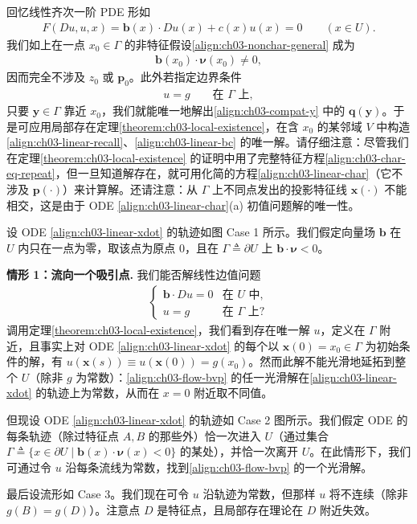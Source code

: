 \documentclass[../../main.tex]{subfiles}
\begin{document}
回忆线性齐次一阶 PDE 形如
\begin{align}\label{align:ch03-linear-recall}
F(Du,u,x)=\mathbf{b}(x)\cdot Du(x)+c(x)u(x)=0 \qquad (x\in U).
\end{align}
我们如上在一点 $x_0\in\Gamma$ 的非特征假设\eqref{align:ch03-nonchar-general} 成为
\begin{align}\label{align:ch03-linear-nonchar}
\mathbf{b}(x_0)\cdot\boldsymbol{\nu}(x_0)\neq 0,
\end{align}
因而完全不涉及 $z_0$ 或 $\mathbf{p}_0$。此外若指定边界条件
\begin{align}\label{align:ch03-linear-bc}
u=g \qquad \text{在 }\Gamma\text{ 上},
\end{align}
只要 $\mathbf{y}\in\Gamma$ 靠近 $x_0$，我们就能唯一地解出\eqref{align:ch03-compat-y} 中的 $\mathbf{q}(\mathbf{y})$。于是可应用局部存在定理\cref{theorem:ch03-local-existence}，在含 $x_0$ 的某邻域 $V$ 中构造\eqref{align:ch03-linear-recall}、\eqref{align:ch03-linear-bc} 的唯一解。请仔细注意：尽管我们在定理\cref{theorem:ch03-local-existence} 的证明中用了完整特征方程\eqref{align:ch03-char-eq-repeat}，但一旦知道解存在，就可用化简的方程\eqref{align:ch03-linear-char}（它不涉及 $\mathbf{p}(\cdot)$）来计算解。还请注意：从 $\Gamma$ 上不同点发出的投影特征线 $\mathbf{x}(\cdot)$ 不能相交，这是由于 ODE \eqref{align:ch03-linear-char}(a) 初值问题解的唯一性。

\begin{example}\label{example:ch03-flow}
设 ODE \eqref{align:ch03-linear-xdot} 的轨迹如图 Case 1 所示。我们假定向量场 $\mathbf{b}$ 在 $U$ 内只在一点为零，取该点为原点 $0$，且在 $\Gamma\triangleq\partial U$ 上 $\mathbf{b}\cdot\boldsymbol{\nu}<0$。

\textbf{情形 1：流向一个吸引点.} 我们能否解线性边值问题
\begin{align}\label{align:ch03-flow-bvp}
\begin{cases}
\mathbf{b}\cdot Du=0 & \text{在 }U\text{ 中},\\
u=g & \text{在 }\Gamma\text{ 上}?
\end{cases}
\end{align}
调用定理\cref{theorem:ch03-local-existence}，我们看到存在唯一解 $u$，定义在 $\Gamma$ 附近，且事实上对 ODE \eqref{align:ch03-linear-xdot} 的每个以 $\mathbf{x}(0)=x_0\in\Gamma$ 为初始条件的解，有 $u(\mathbf{x}(s))\equiv u(\mathbf{x}(0))=g(x_0)$。然而此解不能光滑地延拓到整个 $U$（除非 $g$ 为常数）：\eqref{align:ch03-flow-bvp} 的任一光滑解在\eqref{align:ch03-linear-xdot} 的轨迹上为常数，从而在 $x=0$ 附近取不同值。

但现设 ODE \eqref{align:ch03-linear-xdot} 的轨迹如 Case 2 图所示。我们假定 ODE 的每条轨迹（除过特征点 $A,B$ 的那些外）恰一次进入 $U$（通过集合 $\Gamma\triangleq\{x\in\partial U\mid\mathbf{b}(x)\cdot\boldsymbol{\nu}(x)<0\}$ 的某处），并恰一次离开 $U$。在此情形下，我们可通过令 $u$ 沿每条流线为常数，找到\eqref{align:ch03-flow-bvp} 的一个光滑解。

最后设流形如 Case 3。我们现在可令 $u$ 沿轨迹为常数，但那样 $u$ 将不连续（除非 $g(B)=g(D)$）。注意点 $D$ 是特征点，且局部存在理论在 $D$ 附近失效。
\end{example}
\end{document}
